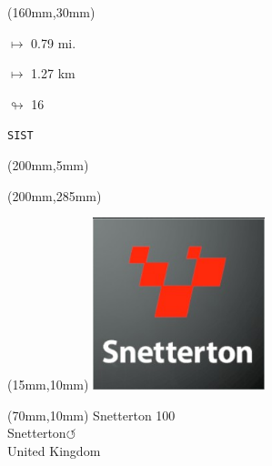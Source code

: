 \begin{textblock*}{40mm}(160mm,30mm)%
\Large
\par$\mapsto$ 0.79 mi.
\par$\mapsto$ 1.27 km
\par$\looparrowright$ 16
\par\hfill\tiny\tt SIST\\
\end{textblock*}
\begin{textblock*}{20mm}(200mm,5mm)%
\fbox{\thepage}
\label{SIST}
\end{textblock*}
\begin{textblock*}{20mm}(200mm,285mm)%
\fbox{\thepage}
\end{textblock*}

\null\newpage
\begin{textblock*}{50mm}(15mm,10mm)%
\includegraphics[width=50mm]{LG/2015-05-20_00095.png}
\end{textblock*}
\begin{textblock*}{130mm}(70mm,10mm)%
{\fontsize{20}{20}\selectfont Snetterton 100\\}
{\fontsize{16}{16}\selectfont Snetterton\hfill \huge$\circlearrowleft$\\}
{\fontsize{12}{12}\selectfont United Kingdom\\}
\end{textblock*}
